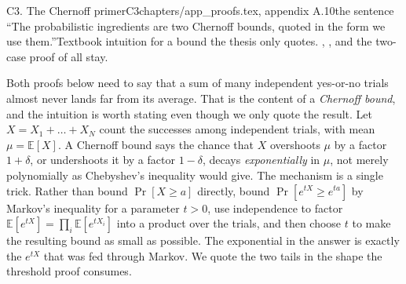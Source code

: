\begin{offcut}{C3. The Chernoff primer}{C3}{chapters/app\_proofs.tex, appendix A.10}{the sentence ``The probabilistic ingredients are two Chernoff bounds, quoted in the form we use them.''}{Textbook intuition for a bound the thesis only quotes. , , and the two-case proof of  all stay.}
\begin{primer}
Both proofs below need to say that a sum of many independent yes-or-no trials
almost never lands far from its average. That is the content of a \emph{Chernoff
bound}, and the intuition is worth stating even though we only quote the result.
Let $X = X_1 + \dots + X_N$ count the successes among independent trials, with mean
$\mu = \mathbb{E}[X]$. A Chernoff bound says the chance that $X$ overshoots $\mu$ by
a factor $1 + \delta$, or undershoots it by a factor $1 - \delta$, decays
\emph{exponentially} in $\mu$, not merely polynomially as Chebyshev's inequality
would give. The mechanism is a single trick. Rather than bound $\Pr[X \ge a]$
directly, bound $\Pr[e^{tX} \ge e^{ta}]$ by Markov's inequality for a parameter
$t > 0$, use independence to factor $\mathbb{E}[e^{tX}] = \prod_i \mathbb{E}[e^{t
X_i}]$ into a product over the trials, and then choose $t$ to make the resulting
bound as small as possible. The exponential in the answer is exactly the $e^{tX}$
that was fed through Markov. We quote the two tails in the shape the threshold
proof consumes.
\end{primer}
\end{offcut}

